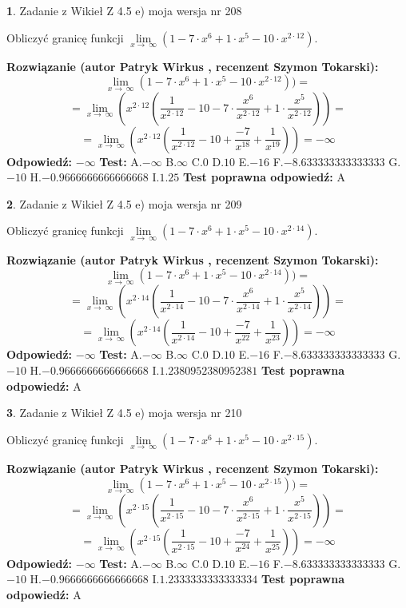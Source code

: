 \documentclass[12pt, a4paper]{article}
\theoremstyle{definition} %
\newtheorem{zad}{}
\newcommand{\zadStart}[1]{\begin{zad}#1\newline}
\newcommand{\zadStop}{\end{zad}}
\newcommand{\rozwStart}[2]{\noindent \textbf{Rozwiązanie (autor #1 , recenzent #2): }\newline}
\newcommand{\rozwStop}{\newline}
\newcommand{\odpStart}{\noindent \textbf{Odpowiedź:}\newline}
\newcommand{\odpStop}{\newline}
\newcommand{\testStart}{\noindent \textbf{Test:}\newline}
\newcommand{\testStop}{\newline}
\newcommand{\kluczStart}{\noindent \textbf{Test poprawna odpowiedź:}\newline}
\newcommand{\kluczStop}{\newline}
\begin{document}
\zadStart{Zadanie z Wikieł Z 4.5 e) moja wersja nr 208}


Obliczyć granicę funkcji  $\lim\limits_{x\to\ \infty}(1 - 7 \cdot x^{6}+1 \cdot x^{5}- 10 \cdot x^{2\cdot12})$.
\zadStop
\rozwStart{Patryk Wirkus}{Szymon Tokarski}
$$\lim\limits_{x\to\ \infty}(1 - 7 \cdot x^{6}+1 \cdot x^{5}- 10 \cdot x^{2\cdot12}))=$$
$$=\lim\limits_{x\to\ \infty}(x^{2\cdot12}(\frac{1}{x^{2\cdot12}}-10 -7 \cdot \frac{x^{6}}{x^{2\cdot12}}+1 \cdot \frac{x^{5}}{x^{2\cdot12}}))=$$
$$=\lim\limits_{x\to\ \infty}(x^{2\cdot12}(\frac{1}{x^{2\cdot12}}-10 + \frac{-7}{x^{18}}+ \frac{1}{x^{19}}))=-\infty$$
\rozwStop
\odpStart
$-\infty$
\odpStop
\testStart
A.$-\infty$ B.$\infty$ C.$0$ D.$10$ E.$-16$
F.$-8.633333333333333$ G.$-10$
H.$-0.9666666666666668$
I.$1.25$
\testStop
\kluczStart
A
\kluczStop



\zadStart{Zadanie z Wikieł Z 4.5 e) moja wersja nr 209}


Obliczyć granicę funkcji  $\lim\limits_{x\to\ \infty}(1 - 7 \cdot x^{6}+1 \cdot x^{5}- 10 \cdot x^{2\cdot14})$.
\zadStop
\rozwStart{Patryk Wirkus}{Szymon Tokarski}
$$\lim\limits_{x\to\ \infty}(1 - 7 \cdot x^{6}+1 \cdot x^{5}- 10 \cdot x^{2\cdot14}))=$$
$$=\lim\limits_{x\to\ \infty}(x^{2\cdot14}(\frac{1}{x^{2\cdot14}}-10 -7 \cdot \frac{x^{6}}{x^{2\cdot14}}+1 \cdot \frac{x^{5}}{x^{2\cdot14}}))=$$
$$=\lim\limits_{x\to\ \infty}(x^{2\cdot14}(\frac{1}{x^{2\cdot14}}-10 + \frac{-7}{x^{22}}+ \frac{1}{x^{23}}))=-\infty$$
\rozwStop
\odpStart
$-\infty$
\odpStop
\testStart
A.$-\infty$ B.$\infty$ C.$0$ D.$10$ E.$-16$
F.$-8.633333333333333$ G.$-10$
H.$-0.9666666666666668$
I.$1.2380952380952381$
\testStop
\kluczStart
A
\kluczStop



\zadStart{Zadanie z Wikieł Z 4.5 e) moja wersja nr 210}


Obliczyć granicę funkcji  $\lim\limits_{x\to\ \infty}(1 - 7 \cdot x^{6}+1 \cdot x^{5}- 10 \cdot x^{2\cdot15})$.
\zadStop
\rozwStart{Patryk Wirkus}{Szymon Tokarski}
$$\lim\limits_{x\to\ \infty}(1 - 7 \cdot x^{6}+1 \cdot x^{5}- 10 \cdot x^{2\cdot15}))=$$
$$=\lim\limits_{x\to\ \infty}(x^{2\cdot15}(\frac{1}{x^{2\cdot15}}-10 -7 \cdot \frac{x^{6}}{x^{2\cdot15}}+1 \cdot \frac{x^{5}}{x^{2\cdot15}}))=$$
$$=\lim\limits_{x\to\ \infty}(x^{2\cdot15}(\frac{1}{x^{2\cdot15}}-10 + \frac{-7}{x^{24}}+ \frac{1}{x^{25}}))=-\infty$$
\rozwStop
\odpStart
$-\infty$
\odpStop
\testStart
A.$-\infty$ B.$\infty$ C.$0$ D.$10$ E.$-16$
F.$-8.633333333333333$ G.$-10$
H.$-0.9666666666666668$
I.$1.2333333333333334$
\testStop
\kluczStart
A
\kluczStop
\end{document}
